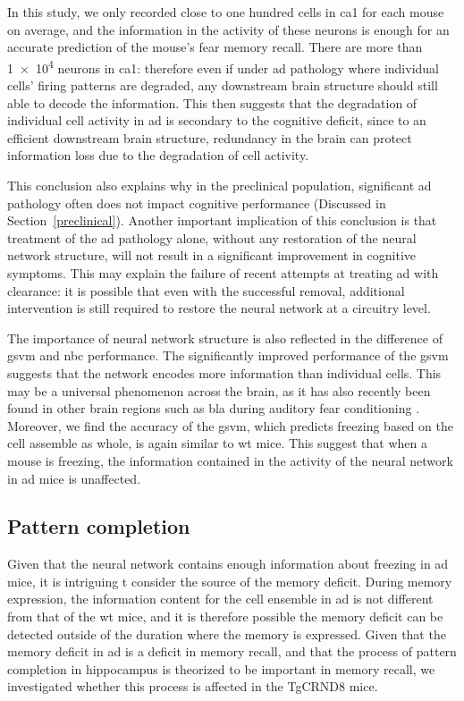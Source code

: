 In this study, we only recorded close to one hundred cells in \gls{ca1} for each mouse on average, and the information in the activity of these neurons is enough for an accurate prediction of the mouse's fear memory recall. There are more than \num{1e4} neurons in \gls{ca1}: therefore even if under \gls{ad} pathology where individual cells' firing patterns are degraded, any downstream brain structure should still able to decode the information. This then suggests that the degradation of individual cell activity in \gls{ad} is secondary to the cognitive deficit, since to an efficient downstream brain structure, redundancy in the brain can protect information loss due to the degradation of cell activity. 

This conclusion also explains why in the preclinical population, significant \gls{ad} pathology often does not impact cognitive performance (Discussed in Section~\ref{preclinical}). Another important implication of this conclusion is that treatment of the \gls{ad} pathology alone, without any restoration of the neural network structure, will not result in a significant improvement in cognitive symptoms. This may explain the failure of recent attempts at treating \gls{ad} with \abeta{} clearance: it is possible that even with the successful \abeta{} removal, additional intervention is still required to restore the neural network at a circuitry level.

The importance of neural network structure is also reflected in the difference of \gls{gsvm} and \gls{nbc} performance. The significantly improved performance of the \gls{gsvm} suggests that the network encodes more information than individual cells. This may be a universal phenomenon across the brain, as it has also recently been found in other brain regions such as \gls{bla} during auditory fear conditioning \citep{grewe17}. Moreover, we find the accuracy of the \gls{gsvm}, which predicts freezing based on the cell assemble as whole, is again similar to \gls{wt} mice. This suggest that when a mouse is freezing, the information contained in the activity of the neural network in \gls{ad} mice is unaffected. 

\subsection{Pattern completion}

Given that the neural network contains enough information about freezing in \gls{ad} mice, it is intriguing t consider the source of the memory deficit. During memory expression, the information content for the cell ensemble in \gls{ad} is not different from that of the \gls{wt} mice, and it is therefore possible the memory deficit can be detected outside of the duration where the memory is expressed. Given that the memory deficit in \gls{ad} is a deficit in memory recall, and that the process of pattern completion in hippocampus is theorized to be important in memory recall, we investigated whether this process is affected in the TgCRND8 mice.

